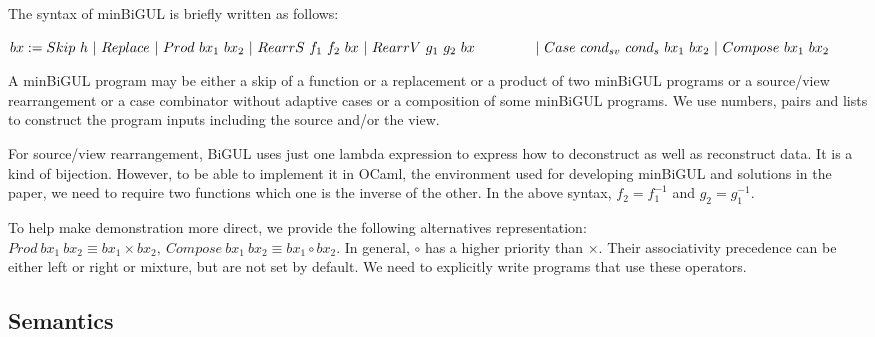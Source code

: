 The syntax of minBiGUL is briefly written as follows:

\smallvspace
    $bx := Skip \ h \
        | \ Replace \
        | \ Prod \ bx_1 \ bx_2 \
        | \ RearrS \ f_1 \ f_2 \ bx \
        | \ RearrV \ g_1 \ g_2 \ bx \\
    \qtabs{2} | \ Case \ cond_{sv} \ cond_{s} \ bx_1 \ bx_2 \
        | \ Compose \ bx_1 \ bx_2$
\smallvspace
        
A minBiGUL program may be either a skip of a function or a replacement or a product of two minBiGUL programs or a source/view rearrangement or a case combinator without adaptive cases or a composition of some minBiGUL programs. We use numbers, pairs and lists to construct the program inputs including the source and/or the view.

For source/view rearrangement, BiGUL uses just one lambda expression to express how to deconstruct as well as reconstruct data. It is a kind of bijection. However, to be able to implement it in OCaml, the environment used for developing minBiGUL and solutions in the paper, we need to require two functions which one is the inverse of the other. In the above syntax, $f_2 = f_1^{-1}$ and $g_2 = g_1^{-1}$.

To help make demonstration more direct, we provide the following alternatives representation: $Prod \ bx_1 \ bx_2 \equiv bx_1 \times bx_2, \ Compose \ bx_1 \ bx_2 \equiv bx_1 \circ bx_2$. In general, $\circ$ has a higher priority than $\times$. Their associativity precedence can be either left or right or mixture, but are not set by default. We need to explicitly write programs that use these operators.

\subsection{Semantics}

